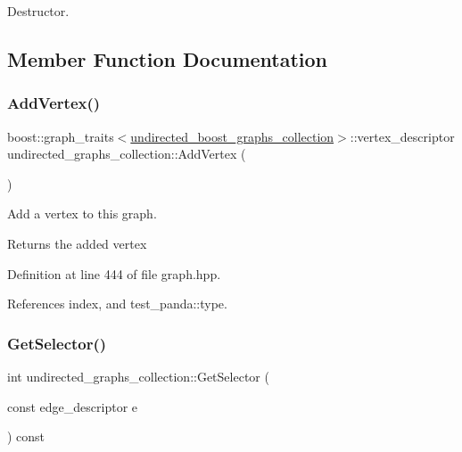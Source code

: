 Destructor. 



\subsection{Member Function Documentation}
\mbox{\label{structundirected__graphs__collection_abe1778a200f95ec69a2a7d47a12ec03a}} 
\subsubsection{\texorpdfstring{Add\+Vertex()}{AddVertex()}}
{\footnotesize\ttfamily boost\+::graph\+\_\+traits$<$\hyperlink{graph_8hpp_ab216188797d8e0a41236453b1a520b16}{undirected\+\_\+boost\+\_\+graphs\+\_\+collection}$>$\+::vertex\+\_\+descriptor undirected\+\_\+graphs\+\_\+collection\+::\+Add\+Vertex (\begin{DoxyParamCaption}{ }\end{DoxyParamCaption})\hspace{0.3cm}{\ttfamily [inline]}}



Add a vertex to this graph. 

\begin{DoxyReturn}{Returns}
the added vertex 
\end{DoxyReturn}


Definition at line 444 of file graph.\+hpp.



References index, and test\+\_\+panda\+::type.

\mbox{\label{structundirected__graphs__collection_ae158b1b071dac0c598811834596bef0d}} 
\subsubsection{\texorpdfstring{Get\+Selector()}{GetSelector()}}
{\footnotesize\ttfamily int undirected\+\_\+graphs\+\_\+collection\+::\+Get\+Selector (\begin{DoxyParamCaption}\item[{const edge\+\_\+descriptor}]{e }\end{DoxyParamCaption}) const\hspace{0.3cm}{\ttfamily [inline]}}




